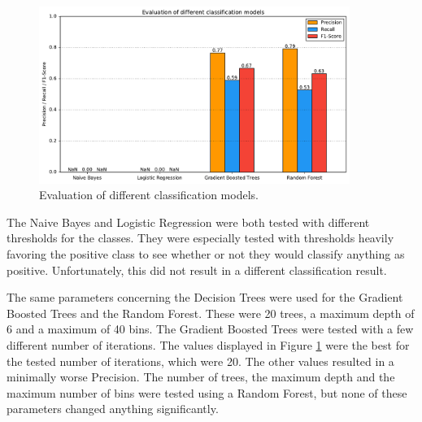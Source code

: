 \begin{figure}[H]
	\centering
	\includegraphics[width=0.9\textwidth]{img/classifier_eval}
	\caption{Evaluation of different classification models.}
	\label{classifier_eval}
\end{figure}
The Naive Bayes and Logistic Regression were both tested with different thresholds for the classes. They were especially tested with thresholds heavily favoring the positive class to see whether or not they would classify anything as positive. Unfortunately, this did not result in a different classification result.\par
The same parameters concerning the Decision Trees were used for the Gradient Boosted Trees and the Random Forest. These were 20 trees, a maximum depth of 6 and a maximum of 40 bins. The Gradient Boosted Trees were tested with a few different number of iterations. The values displayed in Figure \ref{classifier_eval} were the best for the tested number of iterations, which were 20. The other values resulted in a minimally worse Precision. The number of trees, the maximum depth and the maximum number of bins were tested using a Random Forest, but none of these parameters changed anything significantly.\par

